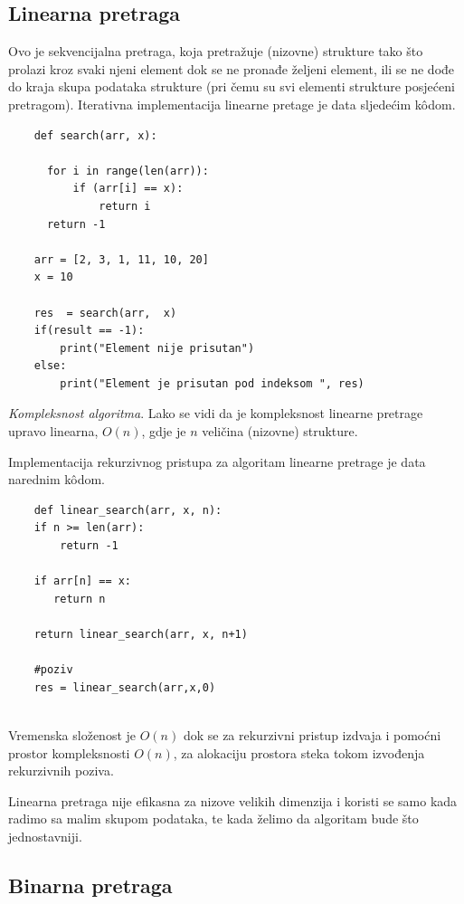 \subsection{Linearna pretraga}
Ovo je sekvencijalna pretraga, koja pretražuje (nizovne) strukture tako što prolazi kroz svaki njeni element dok se ne pronađe željeni element,  ili se ne dođe do kraja skupa podataka strukture (pri čemu su svi elementi strukture posjećeni pretragom).  Iterativna implementacija linearne pretage je data sljedećim k\^odom.

\begin{verbatim}
	def search(arr, x):
	
	  for i in range(len(arr)):
	      if (arr[i] == x):
	          return i
	  return -1
	
	arr = [2, 3, 1, 11, 10, 20]
	x = 10
	
	res  = search(arr,  x)
	if(result == -1):
	    print("Element nije prisutan")
	else:
	    print("Element je prisutan pod indeksom ", res)
\end{verbatim}
\textit{Kompleksnost algoritma}. Lako se vidi da je kompleksnost linearne pretrage upravo linearna, $O(n)$, gdje je $n$ veličina (nizovne) strukture. 

Implementacija rekurzivnog pristupa za algoritam linearne pretrage je data narednim k\^odom.

\begin{verbatim}
	def linear_search(arr, x, n):
	if n >= len(arr):
	    return -1
	
	if arr[n] == x:
	   return n
	
	return linear_search(arr, x, n+1)
	
	#poziv 
	res = linear_search(arr,x,0)
	
\end{verbatim}

Vremenska složenost je $O(n)$ dok se za rekurzivni pristup izdvaja i pomoćni prostor kompleksnosti $O(n)$, za alokaciju prostora steka tokom izvođenja rekurzivnih poziva.


Linearna pretraga nije efikasna za nizove velikih dimenzija i koristi se samo kada radimo sa malim skupom podataka, te kada želimo da algoritam bude  što jednostavniji.

\subsection{Binarna pretraga}

